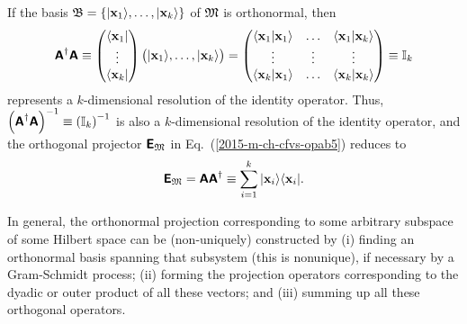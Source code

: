 If the basis ${\frak B}= \left\{
\vert {\bf x}_1 \rangle ,\ldots ,\vert {\bf x}_k \rangle  \right\}$ of ${\frak M}$
is orthonormal, then
\begin{equation}
\begin{split}
\textsf{\textbf{A}}^\dagger
\textsf{\textbf{A}}
\equiv
\begin{pmatrix}
\langle {\bf x}_1 \vert \\ \vdots \\ \langle {\bf x}_k \vert
\end{pmatrix}
\begin{pmatrix}
\vert {\bf x}_1\rangle , \ldots , \vert {\bf x}_k \rangle
\end{pmatrix}
=
\begin{pmatrix}
\langle {\bf x}_1 \vert {\bf x}_1\rangle   & \ldots &    \langle {\bf x}_1 \vert {\bf x}_k\rangle \\
\vdots &  \vdots &   \vdots \\
\langle {\bf x}_k \vert {\bf x}_1\rangle   & \ldots &    \langle {\bf x}_k \vert {\bf x}_k\rangle \\
\end{pmatrix}
\equiv
{\Bbb I}_k
\end{split}
\end{equation}
represents a $k$-dimensional resolution of the identity operator.
Thus, $\left(\textsf{\textbf{A}}^\dagger  \textsf{\textbf{A}} \right)^{-1}\equiv \left({\Bbb I}_k\right)^{-1}$
is also a $k$-dimensional resolution of the identity operator,
and the orthogonal projector $\textsf{\textbf{E}}_{{\frak M}}$
in Eq.~(\ref{2015-m-ch-cfvs-opab5})
reduces to
\begin{equation}
\textsf{\textbf{E}}_{{\frak M}}=
\textsf{\textbf{A}}   \textsf{\textbf{A}}^\dagger
\equiv
\sum_{i=1}^k \vert {\bf x}_i \rangle \langle {\bf x}_i \vert
.
\end{equation}





In general, the orthonormal projection corresponding to some arbitrary subspace of some Hilbert space can be (non-uniquely)
constructed by
(i) finding an orthonormal basis spanning that subsystem (this is nonunique),
if necessary by a Gram-Schmidt process;
(ii) forming the projection operators corresponding to the dyadic or outer product
of all these vectors; and
(iii) summing up all these orthogonal operators.



